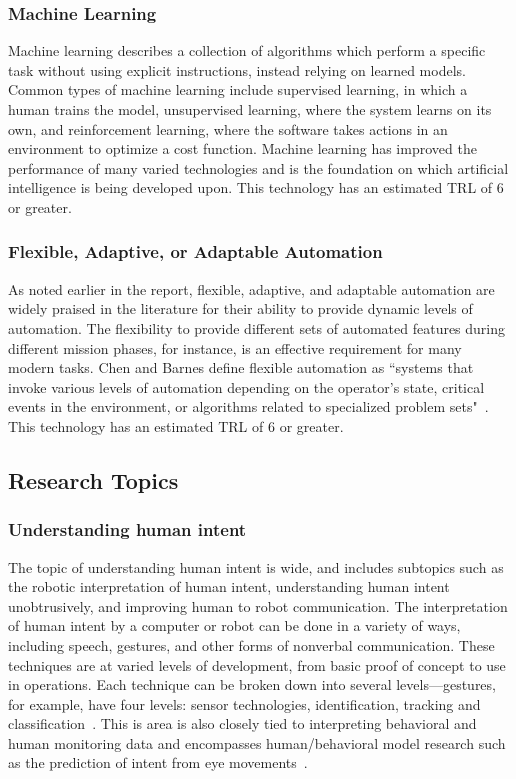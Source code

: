 \subsubsection{Machine Learning}
Machine learning describes a collection of algorithms which perform a specific task without using explicit instructions, instead relying on learned models.
Common types of machine learning include supervised learning, in which a human trains the model, unsupervised learning, where the system learns on its own, and reinforcement learning, where the software takes actions in an environment to optimize a cost function.
Machine learning has improved the performance of many varied technologies and is the foundation on which artificial intelligence is being developed upon.
This technology has an estimated TRL of 6 or greater.

\subsubsection{Flexible, Adaptive, or Adaptable Automation}
As noted earlier in the report, flexible, adaptive, and adaptable automation are widely praised in the literature for their ability to provide dynamic levels of automation.
The flexibility to provide different sets of automated features during different mission phases, for instance, is an effective requirement for many modern tasks.
Chen and Barnes define flexible automation as ``systems that invoke various levels of automation depending on the operator's state, critical events in the environment, or algorithms related to specialized problem sets"~\citep{chen_humanagent_2014}.
This technology has an estimated TRL of 6 or greater.

\subsection{Research Topics}
\subsubsection{Understanding human intent}
The topic of understanding human intent is wide, and includes subtopics such as the robotic interpretation of human intent, understanding human intent unobtrusively, and improving human to robot communication.
The interpretation of human intent by a computer or robot can be done in a variety of ways, including speech, gestures, and other forms of nonverbal communication.
These techniques are at varied levels of development, from basic proof of concept to use in operations.
Each technique can be broken down into several levels—gestures, for example, have four levels: sensor technologies, identification, tracking and classification~\citep{liu_gesture_2018}.
This is area is also closely tied to interpreting behavioral and human monitoring data and encompasses human/behavioral model research such as the prediction of intent from eye movements~\citep{Singh:2018:CPG:3237383.3237457, ruhland_review_2015}.

